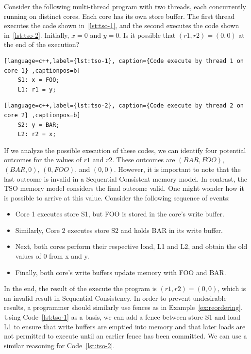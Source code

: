 \begin{example}
  \label{ex:tso-problem}

  Consider the following multi-thread program with two threads, each concurrently running on distinct cores. Each core has its own store buffer. The first thread executes the code shown in~\ref{lst:tso-1}, and the second executes the code shown in~\ref{lst:tso-2}. Initially, \(x = 0\) and \(y = 0\). Is it possible that \((r1, r2) = (0, 0)\) at the end of the execution?

  \begin{lstlisting}[language=c++,label={lst:tso-1}, caption={Code execute by thread 1 on core 1} ,captionpos=b]
    S1: x = FOO;
    L1: r1 = y;
\end{lstlisting}

\begin{lstlisting}[language=c++,label={lst:tso-2}, caption={Code execute by thread 2 on core 2} ,captionpos=b]
    S2: y = BAR;
    L2: r2 = x;
\end{lstlisting}

  If we analyze the possible execution of these codes, we can identify four potential outcomes for the values of \(r1\) and \(r2\). These outcomes are \((BAR, FOO)\), \((BAR, 0)\), \((0, FOO)\), and \((0, 0)\). However, it is important to note that the last outcome is invalid in a Sequential Consistent memory model. In contrast, the TSO memory model considers the final outcome valid. One might wonder how it is possible to arrive at this value. Consider the following sequence of events:

  \begin{itemize}
    \item Core 1 executes store S1, but FOO is stored in the core's write buffer.
    \item Similarly, Core 2 executes store S2 and holds BAR in its write buffer.
    \item Next, both cores perform their respective load, L1 and L2, and obtain the old values of 0 from x and y.
    \item Finally, both core's write buffers update memory with FOO and BAR.
    \end{itemize}

    In the end, the result of the execute the program is \((r1, r2) = (0, 0)\), which is an invalid result in Sequential Consistency. In order to prevent undesirable results, a programmer should similarly use fences as in Example~\ref{ex:reordering}. Using Code~\ref{lst:tso-1} as a basis, we can add a fence between store S1 and load L1 to ensure that write buffers are emptied into memory and that later loads are not permitted to execute until an earlier fence has been committed. We can use a similar reasoning for Code~\ref{lst:tso-2}.

\end{example}

